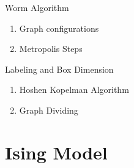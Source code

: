 \documentclass[10pt]{beamer}
\begin{document}
\begin{frame}{Worm Algorithm}
    \begin{enumerate}[$\bullet$]
        \item Graph configurations
        \item Metropolis Steps
    \end{enumerate}
\end{frame}

\begin{frame}{Labeling and Box Dimension}
    \begin{enumerate}[$\bullet$]
        \item Hoshen Kopelman Algorithm
        \item Graph Dividing
    \end{enumerate}
\end{frame}

\section{Ising Model}
\end{document}
